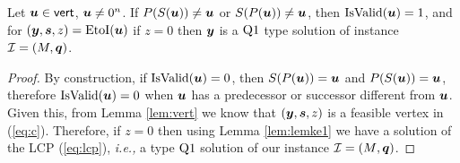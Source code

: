 \begin{lemma}\label{lem:t1}
Let $\uu \in \vert$, $\uu \neq 0^n$. %
If $P(S(\uu))\neq \uu$ or $S(P(\uu))\neq \uu$, then $\isvalid(\uu)=1$, and for $(\yy,\ps,z)=\eti(\uu)$ if $z=0$ then $\yy$ is a $\PLo$ type solution of \PLCP instance $\CI=(M,\qq)$. 
\end{lemma}
\begin{proof}
By construction, if $\isvalid(\uu) = 0$, then $S(P(\uu))=\uu$ and $P(S(\uu))=\uu$, therefore $\isvalid(\uu)=0$ when $\uu$ has a predecessor or successor different from $\uu$.
Given this, from Lemma \ref{lem:vert} we know that $(\yy,\ps,z)$ is a feasible vertex in (\ref{eq:c}). Therefore, if $z=0$ then using Lemma \ref{lem:lemke1} we have a solution of the LCP (\ref{eq:lcp}), {\em i.e.,} a type $\PLo$ solution of our \PLCP instance $\CI=(\MM,\qq)$.
%
%
\end{proof}

